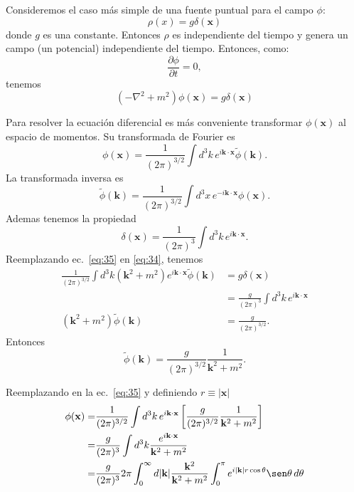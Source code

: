 \begin{frame}
Consideremos el caso m\'as simple de una fuente puntual para el campo
$\phi$:
\begin{equation}
  \label{eq:33}
  \rho(x)=g\delta(\mathbf{x})
\end{equation}
donde $g$ es una constante. Entonces $\rho$ es independiente del tiempo y
genera un campo (un potencial) independiente del tiempo. Entonces,
como:
\begin{equation*}
  \frac{\partial\phi}{\partial t}=0,
\end{equation*}
tenemos
\begin{equation}
  \label{eq:34}
  (-\nabla^2+m^2)\phi(\mathbf{x})=g\delta(\mathbf{x})
\end{equation}

Para resolver la ecuaci\'on diferencial es m\'as conveniente transformar
$\phi(\mathbf{x})$ al espacio de momentos. Su transformada de Fourier es
\begin{equation}
  \label{eq:35}
  \phi(\mathbf{x})=\frac{1}{(2\pi)^{3/2}}\int d^3k\,e^{i\mathbf{k}\cdot\mathbf{x}}\tilde\phi(\mathbf{k}).
\end{equation}
La transformada inversa es
\begin{equation}
  \label{eq:36}
  \tilde\phi(\mathbf{k})=\frac{1}{(2\pi)^{3/2}}\int d^3x\,e^{-i\mathbf{k}\cdot\mathbf{x}}\phi(\mathbf{x}).
\end{equation}
Ademas tenemos la propiedad
\begin{equation}
  \delta(\mathbf{x})=\frac{1}{(2\pi)^3}\int d^3k\,e^{i\mathbf{k}\cdot\mathbf{x}}.
\end{equation}
Reemplazando ec.~\eqref{eq:35} en \eqref{eq:34}, tenemos
\begin{align}
\frac{1}{(2\pi)^{3/2}}\int d^3k(\mathbf{k}^2+m^2)e^{i\mathbf{k}\cdot\mathbf{x}}\tilde\phi(\mathbf{k})&=g\delta(\mathbf{x})\nonumber\\
&=\frac{g}{(2\pi)^3}\int d^3k\,e^{i\mathbf{k}\cdot\mathbf{x}}\nonumber\\
(\mathbf{k}^2+m^2)\tilde\phi(\mathbf{k})&=\frac{g}{(2\pi)^{3/2}}.\nonumber
\end{align}
Entonces
\begin{equation}
  \tilde\phi(\mathbf{k})=\frac{g}{(2\pi)^{3/2}}\frac{1}{\mathbf{k}^2+m^2}.
\end{equation}
\end{frame}
Reemplazando en la ec.~\eqref{eq:35} y definiendo $r\equiv|\mathbf{x}|$
\begin{align}
  \phi(\mathbf{x})=&\frac{1}{(2\pi)^{3/2}}\int d^3k\,e^{i\mathbf{k}\cdot\mathbf{x}}
  \left[
    \frac{g}{(2\pi)^{3/2}}\frac{1}{\mathbf{k}^2+m^2}
  \right]\nonumber\\
=&\frac{g}{(2\pi)^{3}}\int d^3k
    \frac{e^{i\mathbf{k}\cdot\mathbf{x}}}{\mathbf{k}^2+m^2}\nonumber\\
=&\frac{g}{(2\pi)^{3}}2\pi\int_0^\infty d|\mathbf{k}|
    \frac{\mathbf{k}^2}{\mathbf{k}^2+m^2}\int_0^\pi e^{i|\mathbf{k}|r\cos\theta}\sen\theta\,d\theta\nonumber
\end{align}
